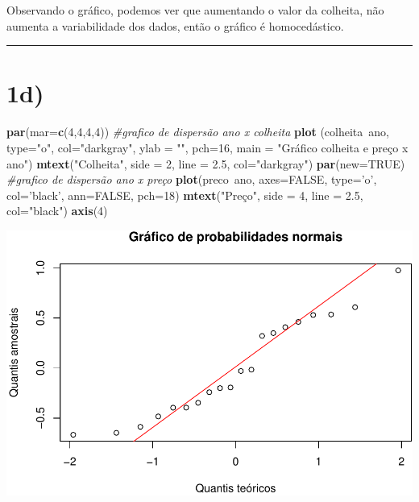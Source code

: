 \documentclass[11pt,]{article}
\makeatletter
\newenvironment{Shaded}{\begin{snugshade}}{\end{snugshade}}
\newcommand{\KeywordTok}[1]{\textcolor[rgb]{0.13,0.29,0.53}{\textbf{{#1}}}}
\newcommand{\DataTypeTok}[1]{\textcolor[rgb]{0.13,0.29,0.53}{{#1}}}
\newcommand{\DecValTok}[1]{\textcolor[rgb]{0.00,0.00,0.81}{{#1}}}
\newcommand{\FloatTok}[1]{\textcolor[rgb]{0.00,0.00,0.81}{{#1}}}
\newcommand{\StringTok}[1]{\textcolor[rgb]{0.31,0.60,0.02}{{#1}}}
\newcommand{\CommentTok}[1]{\textcolor[rgb]{0.56,0.35,0.01}{\textit{{#1}}}}
\newcommand{\OtherTok}[1]{\textcolor[rgb]{0.56,0.35,0.01}{{#1}}}
\newcommand{\NormalTok}[1]{{#1}}
\def\maxwidth{\ifdim\Gin@nat@width>\linewidth\linewidth
\else\Gin@nat@width\fi}
\let\Oldincludegraphics\includegraphics
\renewcommand{\includegraphics}[1]{\Oldincludegraphics[width=\maxwidth]{#1}}
\makeatother
\begin{document}
Observando o gráfico, podemos ver que aumentando o valor da colheita,
não aumenta a variabilidade dos dados, então o gráfico é homocedástico.

\begin{center}\rule{0.5\linewidth}{\linethickness}\end{center}

\section{1d)}\label{d}

\begin{Shaded}
\begin{Highlighting}[]
\KeywordTok{par}\NormalTok{(}\DataTypeTok{mar=}\KeywordTok{c}\NormalTok{(}\DecValTok{4}\NormalTok{,}\DecValTok{4}\NormalTok{,}\DecValTok{4}\NormalTok{,}\DecValTok{4}\NormalTok{))}
\CommentTok{#grafico de dispersão ano x colheita}
\KeywordTok{plot} \NormalTok{(colheita~ano, }\DataTypeTok{type=}\StringTok{"o"}\NormalTok{, }\DataTypeTok{col=}\StringTok{"darkgray"}\NormalTok{, }\DataTypeTok{ylab =} \StringTok{""}\NormalTok{, }\DataTypeTok{pch=}\DecValTok{16}\NormalTok{,}
      \DataTypeTok{main =} \StringTok{"Gráfico colheita e preço x ano"}\NormalTok{)}
\KeywordTok{mtext}\NormalTok{(}\StringTok{"Colheita"}\NormalTok{, }\DataTypeTok{side =} \DecValTok{2}\NormalTok{, }\DataTypeTok{line =} \FloatTok{2.5}\NormalTok{, }\DataTypeTok{col=}\StringTok{"darkgray"}\NormalTok{)}
\KeywordTok{par}\NormalTok{(}\DataTypeTok{new=}\OtherTok{TRUE}\NormalTok{)}
\CommentTok{#grafico de dispersão ano x preço}
\KeywordTok{plot}\NormalTok{(preco~ano, }\DataTypeTok{axes=}\OtherTok{FALSE}\NormalTok{, }\DataTypeTok{type=}\StringTok{'o'}\NormalTok{, }\DataTypeTok{col=}\StringTok{'black'}\NormalTok{, }\DataTypeTok{ann=}\OtherTok{FALSE}\NormalTok{, }\DataTypeTok{pch=}\DecValTok{18}\NormalTok{)}
\KeywordTok{mtext}\NormalTok{(}\StringTok{"Preço"}\NormalTok{, }\DataTypeTok{side =} \DecValTok{4}\NormalTok{, }\DataTypeTok{line =} \FloatTok{2.5}\NormalTok{, }\DataTypeTok{col=}\StringTok{"black"}\NormalTok{)}
\KeywordTok{axis}\NormalTok{(}\DecValTok{4}\NormalTok{)}
\end{Highlighting}
\end{Shaded}

\includegraphics{versaofinal_lista3_files/figure-latex/unnamed-chunk-6-1.pdf}
\end{document}
